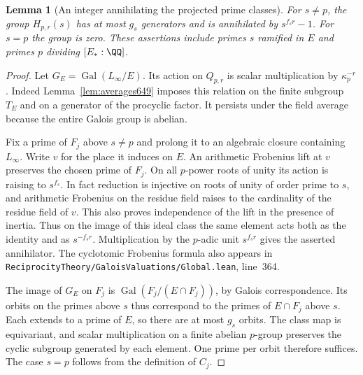 \documentclass[a4paper,11pt]{article}
\newtheorem{lemma}[proposition]{Lemma}
\theoremstyle{definition}
\theoremstyle{remark}
\newcommand{\srcloc}[2]{{\small\nolinkurl{#1.lean}}, line~#2}
\numberwithin{equation}{section}
\begin{document}
\begin{lemma}[An integer annihilating the projected prime classes]
\leavevmode\label{lem:primeann650}
For \(s\ne p\), the group \(H_{p,r}(s)\) has at most \(g_s\)
generators and is annihilated by \(s^{f_s r}-1\).
For \(s=p\) the group is zero. These assertions include
primes \(s\) ramified in \(E\) and primes \(p\) dividing
\([E_*:\QQ]\).
\end{lemma}
\begin{proof}
Let \(G_E=\operatorname{Gal}(L_\infty/E)\). Its action on
\(Q_{p,r}\) is scalar multiplication by \(\kappa_p^{-r}\).
Indeed Lemma~\ref{lem:averages649} imposes this relation on
the finite subgroup \(T_E\) and on a generator of the
procyclic factor. It persists under the field average because
the entire Galois group is abelian.

Fix a prime of \(F_j\) above \(s\ne p\) and prolong it to an
algebraic closure containing \(L_\infty\). Write \(v\) for
the place it induces on \(E\). An arithmetic Frobenius lift
at \(v\) preserves the chosen prime of \(F_j\). On all
\(p\)-power roots of unity its action is raising to
\(s^{f_s}\). In fact reduction is injective on roots of unity
of order prime to \(s\), and arithmetic Frobenius on the
residue field raises to the cardinality of the residue field
of \(v\). This also proves independence of the lift in the
presence of inertia. Thus on the image of this ideal class
the same element acts both as the identity and as
\(s^{-f_s r}\). Multiplication by the \(p\)-adic unit
\(s^{f_s r}\) gives the asserted annihilator. The cyclotomic
Frobenius formula also appears in
\srcloc{ReciprocityTheory/GaloisValuations/Global}{364}.

The image of \(G_E\) on \(F_j\) is
\(\operatorname{Gal}(F_j/(E\cap F_j))\), by Galois
correspondence. Its orbits on the primes above \(s\) thus
correspond to the primes of \(E\cap F_j\) above \(s\).
Each extends to a prime of \(E\), so there are at most
\(g_s\) orbits. The class map is equivariant, and scalar
multiplication on a finite abelian \(p\)-group preserves
the cyclic subgroup generated by each element. One prime
per orbit therefore suffices. The case \(s=p\) follows from
the definition of \(C_j\).
\end{proof}
\end{document}
